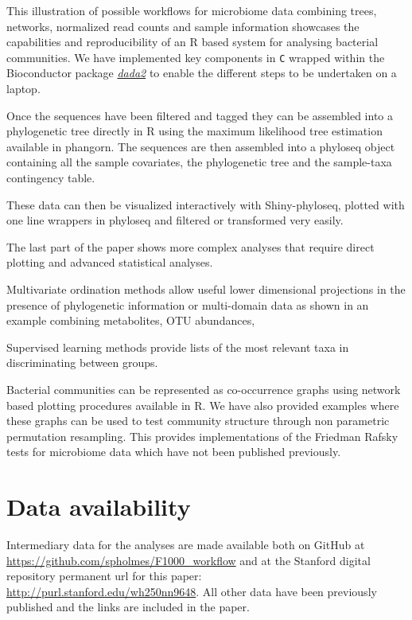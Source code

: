 \documentclass[9pt,a4paper]{extarticle}\usepackage[]{graphicx}\usepackage[]{color}
\makeatletter
\newcommand{\pkgname}[1]{\textit{#1}\xspace}
\newcommand{\CRANurl}[1]{\url{http://cran.r-project.org/package=#1}}
\def\CRANpkg{\@ifstar\@CRANpkg\@@CRANpkg}
\def\@CRANpkg#1{\href{http://cran.r-project.org/package=#1}{\pkgname{#1}}}
\def\@@CRANpkg#1{\href{http://cran.r-project.org/package=#1}{\pkgname{#1}}} %
\newcommand{\BioCpkg}[1]{\href{http://www.bioconductor.org/packages/release/bioc/html/#1.html}{\pkgname{#1}}}
\makeatother
\begin{document}
This illustration of possible workflows for microbiome data combining trees, networks,
normalized read counts and sample information showcases the capabilities
and reproducibility of an R based system for analysing bacterial communities.
We have implemented key components in {\tt C} wrapped within the
Bioconductor package
\BioCpkg{dada2} to enable the different steps to be undertaken on a laptop.

Once the sequences have been filtered and tagged they can be assembled into a phylogenetic tree directly
in R using the maximum likelihood tree estimation available in \CRANpkg{phangorn}.
The sequences are then assembled into a phyloseq object containing all the sample covariates,
the phylogenetic tree and the sample-taxa contingency table.

These data can then be visualized interactively with Shiny-phyloseq, plotted with one line
wrappers in phyloseq and filtered or transformed very easily.

The last part of the paper shows more complex analyses that require direct plotting and advanced statistical analyses.



Multivariate ordination methods allow useful lower dimensional projections in the presence of phylogenetic
information or multi-domain data as shown in an example combining metabolites, OTU abundances,

Supervised learning methods provide lists of the most relevant taxa in
discriminating between groups.

Bacterial communities can be represented as co-occurrence graphs
using network based plotting procedures available in R. We have also
provided examples where these graphs can be used to test
community structure through non parametric permutation resampling.
This provides implementations of the Friedman Rafsky\cite{friedman1979multivariate} tests for microbiome data
which have not been published previously.







\section*{Data availability} %
Intermediary data for the analyses are made available
both on GitHub at
\url{https://github.com/spholmes/F1000_workflow}
and 
at the Stanford
digital repository permanent url for this paper: \\
\url{http://purl.stanford.edu/wh250nn9648}.
All other data have been previously published and the links are included in
the paper.
\end{document}

